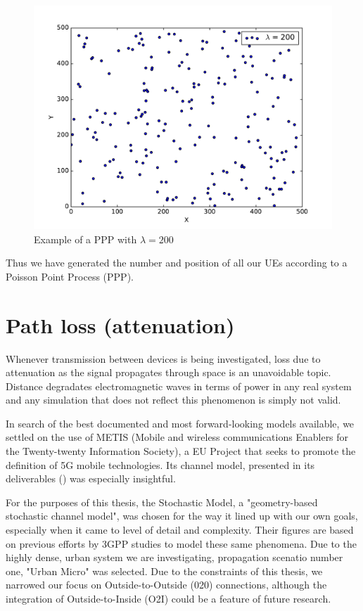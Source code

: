 \begin{figure}[!h]
\centering
\includegraphics[scale = 0.6]{figures/PPP}
\caption{Example of a PPP with $\lambda = 200$}
\end{figure}

Thus we have generated the number and position of all our UEs according to a Poisson Point Process (PPP).

\section{Path loss (attenuation)} \label{PL}
Whenever transmission between devices is being investigated, loss due to attenuation as the signal propagates through space is an unavoidable topic. Distance degradates electromagnetic waves in terms of power in any real system and any simulation that does not reflect this phenomenon is simply not valid. 

In search of the best documented and most forward-looking models available, we settled on the use of METIS (Mobile and wireless communications Enablers for the Twenty-twenty Information Society), a EU Project that seeks to promote the definition of 5G mobile technologies. Its channel model, presented in its deliverables (\cite{Raschkowski}) was especially insightful. 

For the purposes of this thesis, the Stochastic Model, a "geometry-based stochastic channel model", was chosen for the way it lined up with our own goals, especially when it came to level of detail and complexity. Their figures are based on previous efforts by 3GPP studies to model these same phenomena. Due to the highly dense, urban system we are investigating, propagation scenatio number one, "Urban Micro" was selected. Due to the constraints of this thesis, we narrowed our focus on Outside-to-Outside (020) connections, although the integration of Outside-to-Inside (O2I) could be a feature of future research.

